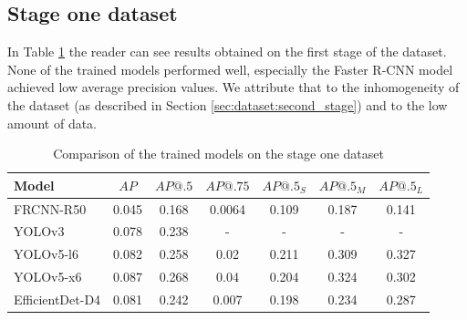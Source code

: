\subsection{Stage one dataset}
In Table \ref{tab:model_results:stage_one} the reader can see results obtained on the first stage of the dataset. None of the trained models performed well, especially the Faster R-CNN model achieved low average precision values. We attribute that to the inhomogeneity of the dataset (as described in Section \ref{sec:dataset:second_stage}) and to the low amount of data.
\begin{table}[H]
    \centering
    \begin{tabular}{|l|c|c|c|c|c|c|}
        \hline
        Model           & $AP$  & $AP@.5$ & $AP@.75$ & $AP@.5_S$ & $AP@.5_M$ & $AP@.5_L$ \\ \hline
        FRCNN-R50       & 0.045 & 0.168   & 0.0064   & 0.109     & 0.187     & 0.141     \\ \hline
        YOLOv3          & 0.078 & 0.238   & -        & -         & -         & -         \\ \hline
        YOLOv5-l6       & 0.082 & 0.258   & 0.02     & 0.211     & 0.309     & 0.327     \\ \hline
        YOLOv5-x6       & 0.087 & 0.268   & 0.04     & 0.204     & 0.324     & 0.302     \\ \hline
        EfficientDet-D4 & 0.081 & 0.242   & 0.007    & 0.198     & 0.234     & 0.287     \\ \hline
    \end{tabular}
    \caption{Comparison of the trained models on the stage one dataset}
    \label{tab:model_results:stage_one}
\end{table}

